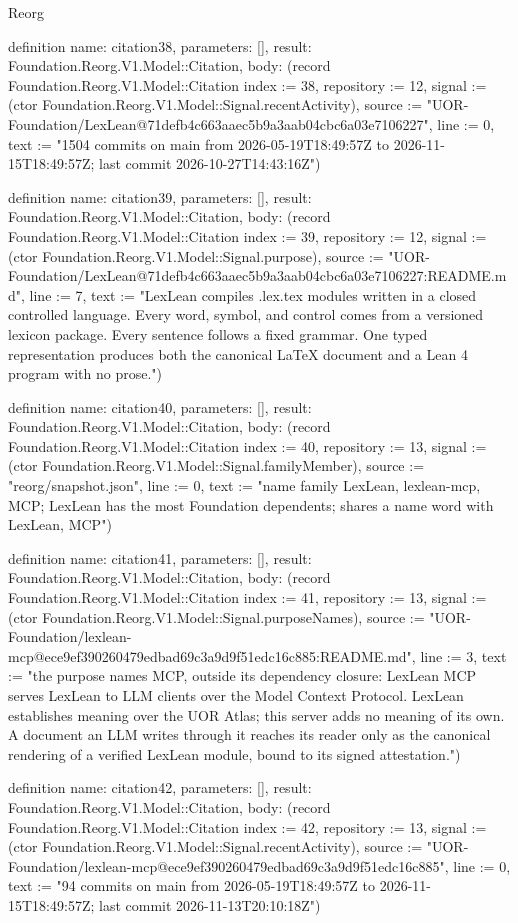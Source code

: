 \begin{lexlean}{Reorg}
\begin{semanticmodule}
definition{
  name: citation38,
  parameters: [],
  result: Foundation.Reorg.V1.Model::Citation,
  body: (record Foundation.Reorg.V1.Model::Citation {index := 38, repository := 12, signal := (ctor Foundation.Reorg.V1.Model::Signal.recentActivity), source := "UOR-Foundation/LexLean@71defb4c663aaec5b9a3aab04cbc6a03e7106227", line := 0, text := "1504 commits on main from 2026-05-19T18:49:57Z to 2026-11-15T18:49:57Z; last commit 2026-10-27T14:43:16Z"})
}

definition{
  name: citation39,
  parameters: [],
  result: Foundation.Reorg.V1.Model::Citation,
  body: (record Foundation.Reorg.V1.Model::Citation {index := 39, repository := 12, signal := (ctor Foundation.Reorg.V1.Model::Signal.purpose), source := "UOR-Foundation/LexLean@71defb4c663aaec5b9a3aab04cbc6a03e7106227:README.md", line := 7, text := "LexLean compiles .lex.tex modules written in a closed controlled language. Every word, symbol, and control comes from a versioned lexicon package. Every sentence follows a fixed grammar. One typed representation produces both the canonical LaTeX document and a Lean 4 program with no prose."})
}

definition{
  name: citation40,
  parameters: [],
  result: Foundation.Reorg.V1.Model::Citation,
  body: (record Foundation.Reorg.V1.Model::Citation {index := 40, repository := 13, signal := (ctor Foundation.Reorg.V1.Model::Signal.familyMember), source := "reorg/snapshot.json", line := 0, text := "name family {LexLean, lexlean-mcp, MCP}; LexLean has the most Foundation dependents; shares a name word with LexLean, MCP"})
}

definition{
  name: citation41,
  parameters: [],
  result: Foundation.Reorg.V1.Model::Citation,
  body: (record Foundation.Reorg.V1.Model::Citation {index := 41, repository := 13, signal := (ctor Foundation.Reorg.V1.Model::Signal.purposeNames), source := "UOR-Foundation/lexlean-mcp@ece9ef390260479edbad69c3a9d9f51edc16c885:README.md", line := 3, text := "the purpose names MCP, outside its dependency closure: LexLean MCP serves LexLean to LLM clients over the Model Context Protocol. LexLean establishes meaning over the UOR Atlas; this server adds no meaning of its own. A document an LLM writes through it reaches its reader only as the canonical rendering of a verified LexLean module, bound to its signed attestation."})
}

definition{
  name: citation42,
  parameters: [],
  result: Foundation.Reorg.V1.Model::Citation,
  body: (record Foundation.Reorg.V1.Model::Citation {index := 42, repository := 13, signal := (ctor Foundation.Reorg.V1.Model::Signal.recentActivity), source := "UOR-Foundation/lexlean-mcp@ece9ef390260479edbad69c3a9d9f51edc16c885", line := 0, text := "94 commits on main from 2026-05-19T18:49:57Z to 2026-11-15T18:49:57Z; last commit 2026-11-13T20:10:18Z"})
}


\end{semanticmodule}
\end{lexlean}
